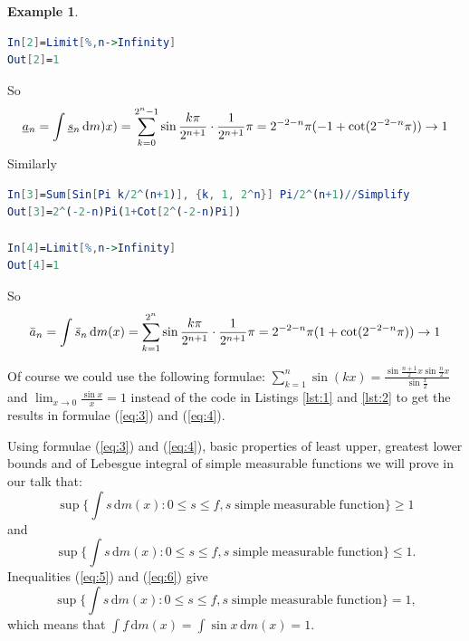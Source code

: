 \documentclass[11pt]{article}
\theoremstyle{definition}
\theoremstyle{definition}
\newtheorem*{example}{Example}
\newcommand{\ds}{\displaystyle}
\newcommand{\dx}{\,\mathrm{d}}
\newcommand{\funder}[1]{\underline{#1}\vphantom{#1}}
\begin{document}
\begin{example}
{\begin{shaded*}
\begin{lstlisting}[language=Mathematica,caption=Mathematica code:\label{lst:1}]
In[2]=Limit[%,n->Infinity]
Out[2]=1
\end{lstlisting}
\end{shaded*}
}
\noindent
So
\begin{equation}
 \label{eq:3}
 \funder{a}_n=\int \funder{s}_n \dx m)x) = \sum_{k=0}^{2^n-1}\sin\frac{k\pi}{2^{n+1}}\cdot \frac {1}{2^{n+1}}\pi = 2^{-2-n}\pi(-1+\cot(2^{-2-n}\pi))\to 1
 \end{equation}
Similarly
{\normalfont
\begin{shaded*}
\begin{lstlisting}[language=Mathematica,caption=Mathematica code:\label{lst:2}]
In[3]=Sum[Sin[Pi k/2^(n+1)], {k, 1, 2^n}] Pi/2^(n+1)//Simplify
Out[3]=2^(-2-n)Pi(1+Cot[2^(-2-n)Pi])

In[4]=Limit[%,n->Infinity]
Out[4]=1
\end{lstlisting}
\end{shaded*}
}
\noindent
So
\begin{equation}
 \label{eq:4}
 \bar{a}_n=\int \bar{s}_n \dx m(x) =
\sum_{k=1}^{2^n}\sin\frac{k\pi}{2^{n+1}}\cdot \frac {1}{2^{n+1}}\pi = 2^{-2-n}\pi(1+\cot(2^{-2-n}\pi))\to 1\\
\end{equation}

\noindent
Of course we could use the following formulae: $\ds \sum_{k=1}^n\sin(kx)=\frac{\sin\frac{n+1}{2}x\sin\frac{n}{2}x}{\sin\frac{x}{2}}$ and $\ds \lim_{x\to 0}\frac{\sin x}{x}=1$ instead of the code in Listings \ref{lst:1} and \ref{lst:2}
to get the results in formulae (\ref{eq:3}) and (\ref{eq:4}).

\quad

\noindent
Using formulae (\ref{eq:3}) and (\ref{eq:4}),  basic properties of least upper, greatest lower bounds and of Lebesgue integral of simple measurable functions we will prove in our talk that:
\begin{equation}
\label{eq:5}
\ds \sup \Big\{ \int s\dx m(x): 0\leq s \leq f, s\; \mathrm{simple\;measurable\; function}\Big\}
\geq 1
\end{equation}
and
\begin{equation}
\label{eq:6}
\ds \sup \Big\{ \int s\dx m(x): 0\leq s \leq f, s\; \mathrm{simple\;measurable\; function}\Big\}
\leq 1.
\end{equation}
Inequalities (\ref{eq:5}) and (\ref{eq:6}) give
$$
\sup \Big\{ \int s\dx m(x): 0\leq s \leq f, s\; \mathrm{simple\;measurable\; function}\Big\} =
1,
$$
which means that
$\ds \int f\dx m(x) = \int \sin x\dx m(x) =1.$



\end{example}
\end{document}
